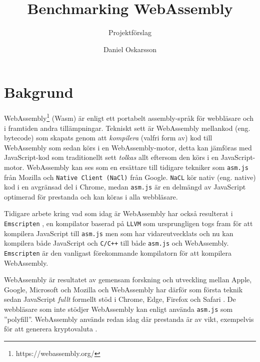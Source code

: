 \documentclass[swedish,template=rapport]{his}
\title{Benchmarking WebAssembly}
\subtitle{Projektförslag}
\author{Daniel Oskarsson}
\begin{document}
\maketitle

\tableofcontents

\clearpage


\section{Bakgrund}

WebAssembly\footnote{https://webassembly.org/} (Wasm) är enligt \textcite{HaasRossbergSchuffTitzerHolmanGohmanWagnerZakaiBastien2017} ett portabelt assembly-språk för webbläsare och i framtiden andra tillämpningar. Tekniskt sett är WebAssembly mellankod (eng. bytecode) som skapats genom att \emph{kompilera} (valfri form av) kod till WebAssembly \parencite{Watt2018} som sedan körs i en WebAssembly-motor, detta kan jämföras med JavaScript-kod som traditionellt sett \emph{tolkas} allt eftersom den körs i en JavaScript-motor. WebAssembly kan ses som en ersättare till tidigare tekniker som \texttt{asm.js} från Mozilla och \texttt{Native Client (NaCl)} från Google. \texttt{NaCL} kör nativ (eng. native) kod i en avgränsad del i Chrome, medan \texttt{asm.js} \parencite{Zakai2018} är en delmängd av JavaScript optimerad för prestanda \parencite{VanEsNicolayStievenartDHondtDeRoover2016} och kan köras i alla webbläsare.

Tidigare arbete kring vad som idag är WebAssembly har också resulterat i \texttt{Emscripten} \parencite{Zakai2011}, en kompilator baserad på \texttt{LLVM} \parencite{LattnerAdve2014} som ursprungligen togs fram för att kompilera JavaScript till \texttt{asm.js} \parencite{Zakai2011} men som har vidareutvecklats \parencite{HaasRossbergSchuffTitzerHolmanGohmanWagnerZakaiBastien2017} och nu kan kompilera både JavaScript och \texttt{C/C++} till både \texttt{asm.js} och WebAssembly. \texttt{Emscripten} är den vanligast förekommande kompilatorn för att kompilera WebAssembly.

WebAssembly är resultatet av gemensam forskning och utveckling mellan  Apple, Google, Microsoft och Mozilla \parencite{HaasRossbergSchuffTitzerHolmanGohmanWagnerZakaiBastien2017} och WebAssembly har därför som första teknik sedan JavaScript \emph{fullt} formellt stöd i Chrome, Edge, Firefox och Safari \parencite{Moller2018}. De webbläsare som inte stödjer WebAssembly kan enligt \textcite{HaasRossbergSchuffTitzerHolmanGohmanWagnerZakaiBastien2017} använda \texttt{asm.js}  som ''polyfill''. WebAssembly används redan idag där prestanda är av vikt, exempelvis för att generera kryptovaluta \parencite{RuthZimmermannWolsingHohlfeld2018}.
\end{document}
